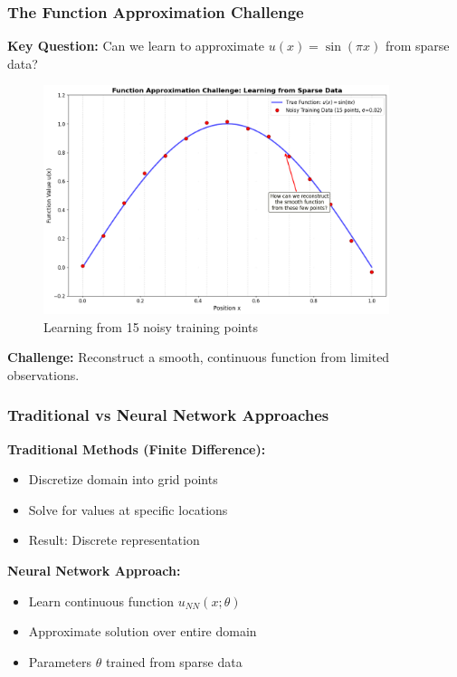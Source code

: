 \documentclass[notes]{beamer}
\begin{document}
\begin{frame}
\frametitle{The Function Approximation Challenge}

\textbf{Key Question:} Can we learn to approximate $u(x) = \sin(\pi x)$ from sparse data?

\begin{figure}[ht]
	\centering
	\includegraphics[width=0.9\textwidth]{figs/sparse-data-challenge.png}
	\caption*{Learning from 15 noisy training points}
\end{figure}

\textbf{Challenge:} Reconstruct a smooth, continuous function from limited observations.

\end{frame}

\begin{frame}
\frametitle{Traditional vs Neural Network Approaches}

\textbf{Traditional Methods (Finite Difference):}
\begin{itemize}
\item Discretize domain into grid points
\item Solve for values at specific locations
\item Result: Discrete representation
\end{itemize}


\textbf{Neural Network Approach:}
\begin{itemize}
\item Learn continuous function $u_{NN}(x; \theta)$
\item Approximate solution over entire domain
\item Parameters $\theta$ trained from sparse data
\end{itemize}

\end{frame}
\end{document}
